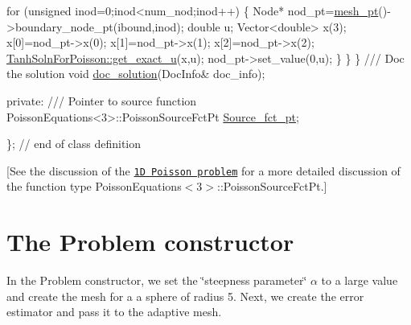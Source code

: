 \begin{DoxyCodeInclude}
   \textcolor{keywordflow}{for} (\textcolor{keywordtype}{unsigned} inod=0;inod<num\_nod;inod++)
    \{
     Node* nod\_pt=\hyperlink{classEighthSpherePoissonProblem_aa33edbb75ba8fe8d4daac3c940a7ff6a}{mesh\_pt}()->boundary\_node\_pt(ibound,inod);
     \textcolor{keywordtype}{double} u;
     Vector<double> x(3);
     x[0]=nod\_pt->x(0);
     x[1]=nod\_pt->x(1);
     x[2]=nod\_pt->x(2);
     \hyperlink{namespaceTanhSolnForPoisson_af7896e9c18ce6438c73ae2a875e8b7de}{TanhSolnForPoisson::get\_exact\_u}(x,u);
     nod\_pt->set\_value(0,u);
    \}
   \}
 \}
 \textcolor{comment}{}
\textcolor{comment}{ /// Doc the solution}
\textcolor{comment}{} \textcolor{keywordtype}{void} \hyperlink{classEighthSpherePoissonProblem_ac8e9911536d04bab829cfe92bb40e302}{doc\_solution}(DocInfo& doc\_info);

\textcolor{keyword}{private}:
\textcolor{comment}{}
\textcolor{comment}{ /// Pointer to source function}
\textcolor{comment}{} PoissonEquations<3>::PoissonSourceFctPt \hyperlink{classEighthSpherePoissonProblem_af41ed0ce372d5932c64b3cd4fe69f312}{Source\_fct\_pt};

\}; \textcolor{comment}{// end of class definition}

\end{DoxyCodeInclude}


\mbox{[}See the discussion of the \href{../../../poisson/one_d_poisson/html/index.html}{\tt 1D Poisson problem} for a more detailed discussion of the function type Poisson\+Equations$<$3$>$\+::\+Poisson\+Source\+Fct\+Pt.\mbox{]}



 

\hypertarget{index_constructor}{}\section{The Problem constructor}\label{index_constructor}
In the {\ttfamily Problem} constructor, we set the \char`\"{}steepness parameter\char`\"{} $ \alpha $ to a large value and create the mesh for a a sphere of radius 5. Next, we create the error estimator and pass it to the adaptive mesh.


